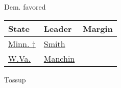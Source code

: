 Dem. favored

\begin{longtable}[]{@{}lll@{}}
\toprule
State & Leader & Margin\tabularnewline
\midrule
\endhead
\href{https://www.nytimes3xbfgragh.onion/elections/results/minnesota-senate-special}{Minn.
†} &
\href{https://www.nytimes3xbfgragh.onion/elections/results/minnesota-senate-special}{Smith}
&
\href{https://www.nytimes3xbfgragh.onion/elections/results/minnesota-senate-special}{}\tabularnewline
\href{https://www.nytimes3xbfgragh.onion/elections/results/west-virginia-senate}{W.Va.}
&
\href{https://www.nytimes3xbfgragh.onion/elections/results/west-virginia-senate}{Manchin}
&
\href{https://www.nytimes3xbfgragh.onion/elections/results/west-virginia-senate}{}\tabularnewline
\bottomrule
\end{longtable}

Tossup

